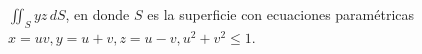 \item $\iint_S yz \, dS$, en donde $S$ es la superficie con ecuaciones paramétricas $x = uv, y = u + v, z = u - v, u^2 + v^2 \le 1$.
